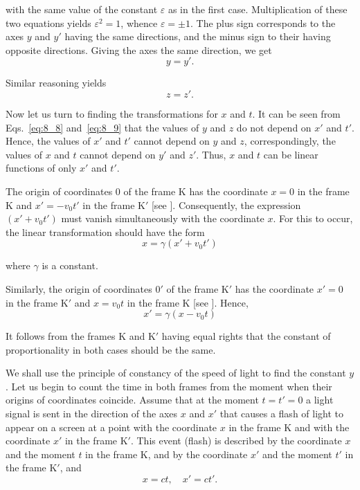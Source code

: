 \noindent
with the same value of the constant $\varepsilon$ as in the first case. Multiplication of these two equations yields $\varepsilon^2 = 1$, whence $\varepsilon=\pm 1$. The plus sign corresponds to the axes $y$ and $y'$ having the same directions, and the minus sign to their having opposite directions. Giving the axes the same direction, we get
\begin{equation}\label{eq:8_8}
	y = y'.
\end{equation}

\noindent
Similar reasoning yields
\begin{equation}\label{eq:8_9}
	z = z'.
\end{equation}

Now let us turn to finding the transformations for $x$ and $t$. It can be seen from Eqs.~\eqref{eq:8_8} and~\eqref{eq:8_9} that the values of $y$ and $z$ do not depend on $x'$ and $t'$. Hence, the values of $x'$ and $t'$ cannot depend on $y$ and $z$, correspondingly, the values of $x$ and $t$ cannot depend on $y'$ and $z'$. Thus, $x$ and $t$ can be linear functions of only $x'$ and $t'$.

The origin of coordinates $0$ of the frame K has the coordinate $x=0$ in the frame K and $x'=-v_0t'$ in the frame K$'$ [see ]. Consequently, the expression $(x'+v_0t')$ must vanish simultaneously with the coordinate $x$. For this to occur, the linear transformation should have the form
\begin{equation}\label{eq:8_10}
	x = \gamma (x' + v_0 t')
\end{equation}

\noindent
where $\gamma$ is a constant.

Similarly, the origin of coordinates $0'$ of the frame K$'$ has the coordinate $x'=0$ in the frame K$'$ and $x=v_0t$ in the frame K [see ]. Hence,
\begin{equation}\label{eq:8_11}
	x' = \gamma (x - v_0 t)
\end{equation}

\noindent
It follows from the frames K and K$'$ having equal rights that the constant of proportionality in both cases should be the same.

We shall use the principle of constancy of the speed of light to find the constant $y$. Let us begin to count the time in both frames from the moment when their origins of coordinates coincide. Assume that at the moment $t=t'=0$ a light signal is sent in the direction of the axes $x$ and $x'$ that causes a flash of light to appear on a screen at a point with the coordinate $x$ in the frame K and with the coordinate $x'$ in the frame K$'$. This event (flash) is described by the coordinate $x$ and the moment $t$ in the frame K, and by the coordinate $x'$ and the moment $t'$ in the frame K$'$, and
\begin{equation*}
	x = ct,\quad x' = ct'.
\end{equation*}

